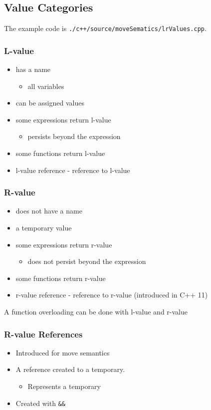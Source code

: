 \subsection{Value Categories} 

The example code is \texttt{./c++/source/moveSematics/lrValues.cpp}.

\subsubsection{L-value} 

\begin{itemize}
    \item has a name
    \begin{itemize}
      \item all variables
    \end{itemize}
    \item can be assigned values
    \item some expressions return l-value
    \begin{itemize}
      \item persists beyond the expression
    \end{itemize}
    \item some functions return l-value
    \item l-value reference - reference to l-value
\end{itemize}

\subsubsection{R-value} 

\begin{itemize}
    \item does not have a name
    \item a temporary value
    \item some expressions return r-value
    \begin{itemize}
      \item does not persist beyond the expression
    \end{itemize}
    \item some functions return r-value
    \item r-value reference - reference to r-value (introduced in C++ 11)
\end{itemize}

A function overloading can be done with l-value and r-value

\subsubsection{R-value References} 

\begin{itemize}
    \item Introduced for move semantics
    \item A reference created to a temporary.
    \begin{itemize}
      \item Represents a temporary
    \end{itemize}
  \item Created with \texttt{&&}
\end{itemize}
